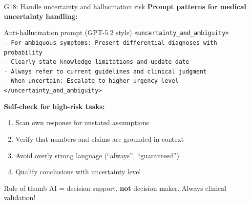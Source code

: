 \documentclass[aspectratio=169, 10pt]{beamer}
\begin{document}
\begin{frame}{G18: Handle uncertainty and hallucination risk}
    \textbf{Prompt patterns for medical uncertainty handling:}
    
    \vspace{0.2cm}
    \begin{block}{\footnotesize Anti-hallucination prompt (GPT-5.2 style)}
        \scriptsize
        \texttt{<uncertainty\_and\_ambiguity>} \\
        \texttt{- For ambiguous symptoms: Present differential diagnoses with probability} \\
        \texttt{- Clearly state knowledge limitations and update date} \\
        \texttt{- Always refer to current guidelines and clinical judgment} \\
        \texttt{- When uncertain: Escalate to higher urgency level} \\
        \texttt{</uncertainty\_and\_ambiguity>}
    \end{block}
    
    \vspace{0.15cm}
    \textbf{Self-check for high-risk tasks:}
    \footnotesize
    \begin{enumerate}
        \item Scan own response for unstated assumptions
        \item Verify that numbers and claims are grounded in context
        \item Avoid overly strong language (``always'', ``guaranteed'')
        \item Qualify conclusions with uncertainty level
    \end{enumerate}
    
    \normalsize
    \begin{alertblock}{\footnotesize Rule of thumb}
        \footnotesize AI = decision support, \textbf{not} decision maker. Always clinical validation!
    \end{alertblock}
\end{frame}
\end{document}
